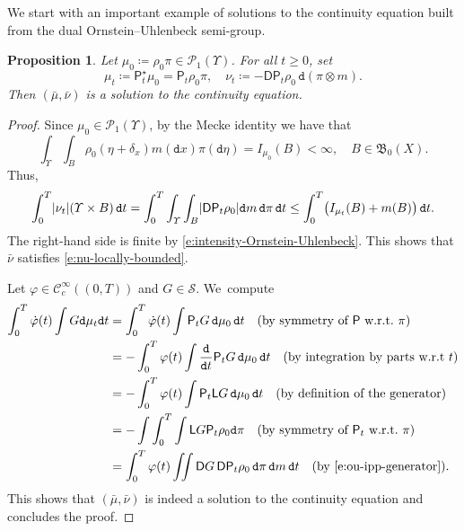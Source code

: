 \documentclass[10pt]{amsart}
\newtheorem{proposition}[theorem]{Proposition}
\theoremstyle{definition}
\theoremstyle{remark}
\DeclarePairedDelimiter{\paren}{\lparen}{\rparen}
\DeclarePairedDelimiter{\abs}{\lvert}{\rvert}
\begin{document}
We start with an important example of solutions to the continuity equation built from the dual Ornstein--Uhlenbeck semi-group.
\begin{proposition}\label{t:ou-solution}
Let $\mu_{0} \coloneq \rho_{0} \pi \in \mathscr{P}_{1}(\varUpsilon)$.
For all $t \geq 0$, set
\begin{equation*}
\mu_{t} \coloneq \mathsf{P}^{\star}_{t} \mu_{0} = \mathsf{P}_{t} \rho_{0} \pi, \quad \nu_{t} \coloneq - \mathsf{D} \mathsf{P}_{t} \rho_{0}\, \mathtt{d} (\pi \otimes m).
\end{equation*}
Then $(\bar{\mu}, \bar{\nu})$ is a solution to the continuity equation.
\end{proposition}
\begin{proof}
Since $\mu_{0} \in \mathscr{P}_{1}(\varUpsilon)$, by the Mecke identity we have that
\begin{equation}\label{e:l1-loc}
\int_{\varUpsilon} \int_{B} \rho_{0}(\eta + \delta_{x}) m(\mathtt{d} x) \pi(\mathtt{d} \eta) = I_{\mu_{0}}(B) < \infty, \quad B \in \mathfrak{B}_{0}(X).
\end{equation}
Thus,
\begin{equation*}
\int_{0}^{T} \abs{\nu_{t}}(\varUpsilon \times B)\, \mathtt{d} t = \int_{0}^{T} \int_{\varUpsilon} \int_{B} \abs{\mathsf{D} \mathsf{P}_{t} \rho_{0}} \mathtt{d} m\, \mathtt{d} \pi\, \mathtt{d} t \leq \int_{0}^{T} \paren[\big]{ I_{\mu_{t}}(B) + m(B) }\, \mathtt{d} t.
\end{equation*}
The right-hand side is finite by \cref{e:intensity-Ornstein-Uhlenbeck}.
This shows that $\bar{\nu}$ satisfies \cref{e:nu-locally-bounded}.

Let $\varphi \in \mathscr{C}_{c}^{\infty}((0,T))$ and $G \in \mathscr{S}$. We~compute
\begin{equation*}
\begin{split}
\int_{0}^{T} \dot{\varphi}(t) \int G \mathtt{d} \mu_{t} \mathtt{d} t &= \int_{0}^{T} \dot{\varphi}(t) \int \mathsf{P}_{t} G\, \mathtt{d} \mu_{0}\, \mathtt{d} t \quad \text{(by symmetry of $\mathsf{P}$ w.r.t.~$\pi$)}\\
&= - \int_{0}^{T} \varphi(t) \int \frac{\mathtt{d}}{\mathtt{d} t} \mathsf{P}_{t} G\, \mathtt{d} \mu_{0}\, \mathtt{d} t \quad \text{(by integration by parts w.r.t~$t$)} \\
&= - \int_{0}^{T} \varphi(t) \int \mathsf{P}_{t} \mathsf{L} G\, \mathtt{d} \mu_{0}\, \mathtt{d} t \quad \text{(by definition of the generator)} \\
&= - \int \int_{0}^{T} \int \mathsf{L} G \mathsf{P}_{t} \rho_{0} \mathtt{d} \pi \quad \text{(by symmetry of $\mathsf{P}_{t}$ w.r.t.~$\pi$)} \\
&= \int_{0}^{T} \varphi(t) \iint \mathsf{D} G\, \mathsf{D} \mathsf{P}_{t} \rho_0\, \mathtt{d} \pi\, \mathtt{d} m\, \mathtt{d} t \quad \text{(by \cref{e:ou-ipp-generator})}.
\end{split}
\end{equation*}
This shows that $(\bar{\mu}, \bar{\nu})$ is indeed a solution to the continuity equation and concludes the proof.
\end{proof}
\end{document}
